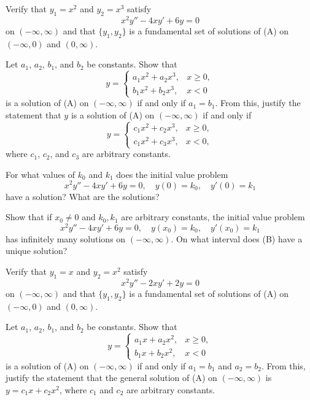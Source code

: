 \begin{exerciselist}
\item\label{exer:5.1.42}\begin{alist}
\item %
Verify  that $y_1=x^2$ and $y_2=x^3$ satisfy
\[
x^2y''-4xy'+6y=0
\tag{A}
\]
on $(-\infty,\infty)$ and that $\{y_1,y_2\}$ is a fundamental set of
solutions of (A) on $(-\infty,0)$ and
$(0,\infty)$.
\item %
Let $a_1$, $a_2$, $b_1$, and $b_2$ be constants. Show that
\[
y=\begin{cases}
a_1x^2+a_2x^3,&x\ge 0,\\
b_1x^2+b_2x^3,&x<0\phantom{,}
\end{cases}
\]
is a solution of  (A) on $(-\infty,\infty)$
if and only if $a_1=b_1$. From this, justify the statement that
$y$ is a  solution of (A) on $(-\infty,\infty)$
if and only if
\[
y=\begin{cases}
c_1x^2+c_2x^3,&x\ge 0,\\
c_1x^2+c_3x^3,&x<0,
\end{cases}
\]
where $c_1$, $c_2$, and $c_3$ are arbitrary constants.

\item %
 For what values of $k_0$ and  $k_1$
does the initial value problem
\[
x^2y''-4xy'+6y=0,\quad y(0)=k_0,\quad y'(0)=k_1
\]
have a solution? What are the solutions?

\item %
 Show that if $x_0\ne0$ and $k_0,k_1$  are
arbitrary constants,  the initial value problem
\[
x^2y''-4xy'+6y=0,\quad y(x_0)=k_0,\quad y'(x_0)=k_1
\tag{B}
\]
has infinitely many solutions on $(-\infty,\infty)$.  On what interval does
(B) have a unique solution?
\end{alist}

\item\label{exer:5.1.43}\begin{alist}
\item %
Verify  that $y_1=x$ and $y_2=x^2$ satisfy
\[
x^2y''-2xy'+2y=0
\tag{A}
\]
on $(-\infty,\infty)$ and that $\{y_1,y_2\}$ is a fundamental set of
solutions of (A) on $(-\infty,0)$ and
$(0,\infty)$.
\item %
Let $a_1$, $a_2$, $b_1$, and $b_2$ be constants. Show that
\[
y=\begin{cases}
a_1x+a_2x^2,&x\ge 0,\\
b_1x+b_2x^2,&x<0\phantom{,}
\end{cases}
\]
is a solution of  (A) on $(-\infty,\infty)$
if and only if $a_1=b_1$ and $a_2=b_2$. From this, justify the
statement that the
 general solution of (A) on $(-\infty,\infty)$
is $y=c_1x+c_2x^2$, where $c_1$ and $c_2$ are arbitrary
constants.


\end{alist}
\end{exerciselist}

